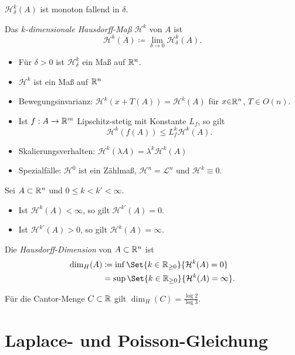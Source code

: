 \documentclass{cheat-sheet}
\newcommand{\HM}{\mathcal{H}} %
\begin{document}
\begin{bem}
  $\HM_\delta^k(A)$ ist monoton fallend in $\delta$.
\end{bem}

\begin{defn}
  Das \emph{$k$-dimensionale Hausdorff-Maß} $\HM^k$ von $A$ ist
  \[ \HM^k(A) \coloneqq \lim_{\delta \to 0} \HM_\delta^k(A). \]
\end{defn}

\begin{prop}
  \begin{itemize}
    \item Für $\delta > 0$ ist $\HM_\delta^k$ ein Maß auf $\mathbb{R}^n$.
    \item $\HM^k$ ist ein Maß auf $\mathbb{R}^n$
    \item Bewegungsinvarianz: $\HM^k(x + T(A)) = \HM^k(A)$ für $x {\in} \mathbb{R}^n$, $T {\in} O(n)$.
    \item Ist $f : A \to \mathbb{R}^m$ Lipschitz-stetig mit Konstante $L_f$, so gilt
    \[ \HM^k(f(A)) \leq L_f^k \HM^k(A). \]
    \item Skalierungsverhalten: $\HM^k(\lambda A) = \lambda^k \HM^k(A)$
    \item Spezialfälle: $\HM^0$ ist ein Zählmaß, $\HM^n = \mathcal{L}^n$ und $\HM^k \equiv 0$.
  \end{itemize}
\end{prop}

\begin{lem}
  Sei $A \subset \mathbb{R}^n$ und $0 \leq k < k' < \infty$.
  \begin{itemize}
    \item Ist $\HM^k(A) < \infty$, so gilt $\HM^{k'}(A) = 0$.
    \item Ist $\HM^{k'}(A) > 0$, so gilt $\HM^k(A) = \infty$.
  \end{itemize}
\end{lem}

\begin{defn}
  Die \emph{Hausdorff-Dimension} von $A \subset \mathbb{R}^n$ ist
  \begin{align*}
    \dim_H(A) &\coloneqq \inf \Set{k \in \R_{\geq 0}}{\HM^k(A) = 0}\\
    &= \sup \Set{k \in \R_{\geq 0}}{\HM^k(A) = \infty}.
  \end{align*}
\end{defn}

\begin{samepage}

\begin{prop}
  Für die Cantor-Menge $C \subset \mathbb{R}$ gilt $\dim_H(C) = \frac{\log 2}{\log 3}$.
\end{prop}


\section{Laplace- und Poisson-Gleichung}

\end{samepage}
\end{document}
